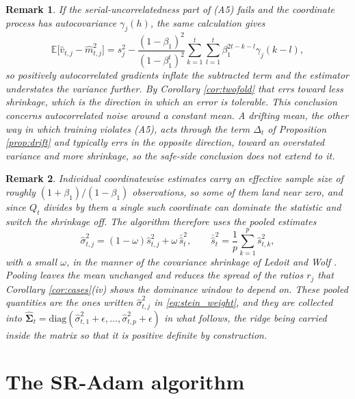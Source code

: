 \documentclass[pdflatex,sn-mathphys-num]{sn-jnl}%
\theoremstyle{thmstyleone}%
\theoremstyle{thmstyletwo}%
\newtheorem{remark}{Remark}%
\theoremstyle{thmstylethree}%
\newcommand{\rev}[1]{{\color{blue}#1}}
\newcommand{\diag}{\mathrm{diag}}
\newcommand{\E}{\mathbb{E}}
\begin{document}
\begin{remark}
\label{rem:a5}
If the serial-uncorrelatedness part of (A5) fails and the coordinate process has autocovariance $\gamma_j(h)$, the same calculation gives
\begin{equation}
\E\bigl[\hat v_{t,j}-\hat m^2_{t,j}\bigr]
=
s^2_j-\frac{(1-\beta_1)^2}{(1-\beta_1^{t})^{2}}\sum_{k=1}^{t}\sum_{l=1}^{t}\beta_1^{2t-k-l}\gamma_j(k-l),
\end{equation}
so positively autocorrelated gradients inflate the subtracted term and the estimator understates the variance further. By Corollary \ref{cor:twofold} that errs toward less shrinkage, which is the direction in which an error is tolerable. \rev{This conclusion concerns autocorrelated noise around a constant mean. A drifting mean, the other way in which training violates (A5), acts through the term $\Delta_t$ of Proposition \ref{prop:drift} and typically errs in the opposite direction, toward an overstated variance and more shrinkage, so the safe-side conclusion does not extend to it.}
\end{remark}

\begin{remark}
\label{rem:pooling}
Individual coordinatewise estimates carry an effective sample size of roughly $(1+\beta_1)/(1-\beta_1)$ observations, so some of them land near zero, and since $Q_t$ divides by them a single such coordinate can dominate the statistic and switch the shrinkage off. The algorithm therefore uses the pooled estimates
\begin{equation}
\label{eq:pooled}
\hat\sigma^2_{t,j}=(1-\omega)\hat s^2_{t,j}+\omega\,\bar{\hat s}^2_t,
\qquad
\bar{\hat s}^2_t=\frac1p\sum_{k=1}^{p}\hat s^2_{t,k},
\end{equation}
with a small $\omega$, in the manner of the covariance shrinkage of Ledoit and Wolf \cite{ledoit2004}. Pooling leaves the mean unchanged and reduces the spread of the ratios $r_j$ that Corollary \ref{cor:cases}(iv) shows the dominance window to depend on. These pooled quantities are the ones written $\hat\sigma^2_{t,j}$ in \eqref{eq:stein_weight}, and they are collected into $\widehat{\bm\Sigma}_t=\diag(\hat\sigma^2_{t,1}+\epsilon,\dots,\hat\sigma^2_{t,p}+\epsilon)$ in what follows, the ridge being carried inside the matrix so that it is positive definite by construction.
\end{remark}

\section{The SR-Adam algorithm}
\label{sec:algorithm}
\end{document}
